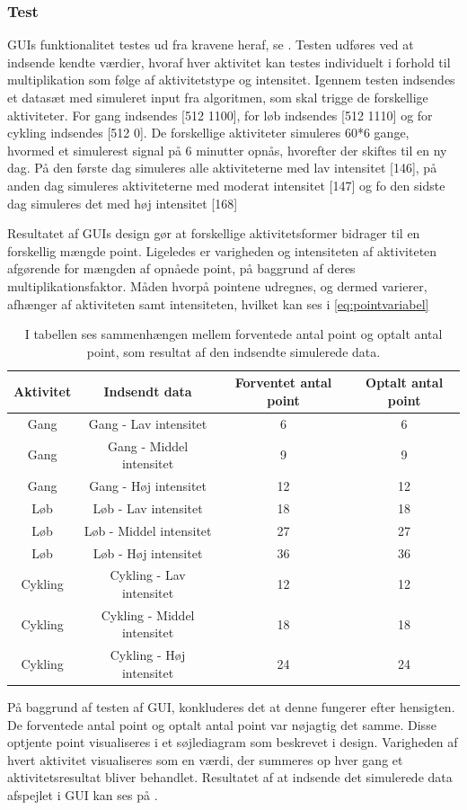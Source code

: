 \subsubsection{Test}
GUIs funktionalitet testes ud fra kravene heraf, se . Testen udføres ved at indsende kendte værdier, hvoraf hver aktivitet kan testes individuelt i forhold til multiplikation som følge af aktivitetstype og intensitet.
Igennem testen indsendes et datasæt med simuleret input fra algoritmen, som skal trigge de forskellige aktiviteter. For gang indsendes [512 1100], for løb indsendes [512 1110] og for cykling indsendes [512 0]. De forskellige aktiviteter simuleres 60*6 gange, hvormed et simulerest signal på 6 minutter opnås, hvorefter der skiftes til en ny dag. På den første dag simuleres alle aktiviteterne med lav intensitet [146], på anden dag simuleres aktiviteterne med moderat intensitet [147] og fo den sidste dag simuleres det med høj intensitet [168]

Resultatet af GUIs design gør at forskellige aktivitetsformer bidrager til en forskellig mængde point. Ligeledes er varigheden og intensiteten  af aktiviteten afgørende for mængden af opnåede point, på baggrund af deres multiplikationsfaktor. Måden hvorpå pointene udregnes, og dermed varierer, afhænger af aktiviteten samt intensiteten, hvilket kan ses i \eqref{eq:pointvariabel}
\begin{table}[H]
	\centering
	\begin{tabular}{cccc}
		\hline
		\rowcolor[HTML]{C0C0C0} 
		Aktivitet & Indsendt data & Forventet antal point & Optalt antal point \\ \hline
		Gang 	& Gang - Lav intensitet 		& 6 & 6 \\ \hline
		Gang 	& Gang - Middel intensitet 		& 9 & 9 \\ \hline
		Gang 	& Gang - Høj intensitet 		& 12 & 12 \\ \hline
		Løb 	& Løb - Lav intensitet 			& 18 & 18 \\ \hline
		Løb 	& Løb - Middel intensitet 		& 27 & 27 \\ \hline
		Løb 	& Løb - Høj intensitet 			& 36 & 36 \\ \hline
		Cykling & Cykling - Lav intensitet 		& 12 & 12 \\ \hline
		Cykling & Cykling - Middel intensitet 	& 18 & 18 \\ \hline
		Cykling & Cykling - Høj intensitet 		& 24 & 24 \\ \hline
	\end{tabular}
	\caption{I tabellen ses sammenhængen mellem forventede antal point og optalt antal point, som resultat af den indsendte simulerede data.}
	\label{test:GUI}
\end{table}\vspace{-.5cm}
På baggrund af testen af GUI, konkluderes det at denne fungerer efter hensigten. De forventede antal point og optalt antal point var nøjagtig det samme. Disse optjente point visualiseres i et søjlediagram som beskrevet i design. Varigheden af hvert aktivitet visualiseres som en værdi, der summeres op hver gang et aktivitetsresultat bliver behandlet. Resultatet af at indsende det simulerede data afspejlet i GUI kan ses på .

